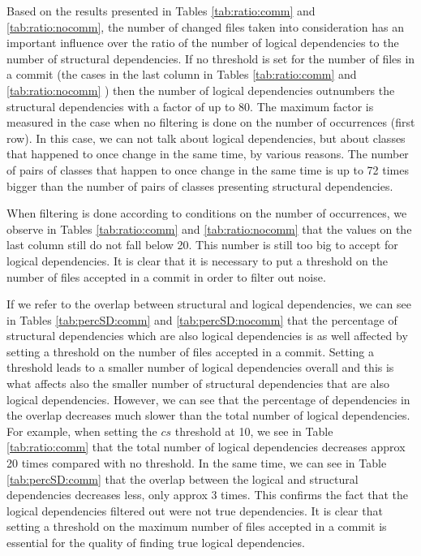\documentclass[a4paper,twoside]{article}
\begin{document}
Based on the results presented in Tables \ref{tab:ratio:comm} and \ref{tab:ratio:nocomm}, the number 
of changed files taken into consideration has an important influence over the ratio of the number  of 
logical dependencies to the number of structural dependencies.  If no threshold is set for the number of files in a commit (the cases in the last column in Tables \ref{tab:ratio:comm} and 
\ref{tab:ratio:nocomm} ) then the number of logical dependencies outnumbers the structural dependencies with a factor of up to 80. The maximum factor is measured in the case when no filtering is done on the number of occurrences (first row).  
In this case, we can not talk about logical dependencies, but about classes that happened to once change in the same time, by various reasons. The number of pairs of classes that happen to once change in the same time is up to 72 times bigger than the number of pairs of classes presenting structural dependencies.

When filtering is done according to conditions on the number of occurrences, we observe in Tables \ref{tab:ratio:comm} and \ref{tab:ratio:nocomm} that the values on the last column still do not fall below 20. This number is still too big to accept for logical dependencies.  It is clear that it is necessary to  put a threshold on the number of files accepted in a commit in order to filter out noise.


If we refer to the overlap between structural and logical dependencies, we can see in Tables \ref{tab:percSD:comm} and \ref{tab:percSD:nocomm} that the percentage of structural dependencies which are also logical dependencies is as well affected by setting a threshold on the number of files accepted in a commit. Setting a threshold leads to a smaller number of logical dependencies overall and this is what affects also the smaller number of structural dependencies that are also logical dependencies. However, we can see that the percentage of dependencies in the overlap decreases much slower than the total number of logical dependencies. For example, when setting  the $cs$ threshold at 10, we see in Table \ref{tab:ratio:comm} that the total number of logical dependencies decreases approx 20 times compared with no threshold. In the same time, we can see in Table \ref{tab:percSD:comm}  that the overlap between the logical and structural dependencies decreases less, only approx 3 times. This confirms the fact that the logical dependencies filtered out were not true dependencies. It is clear that setting a threshold on the maximum number of files accepted in a commit is essential for the quality of finding true logical dependencies.
\end{document}
